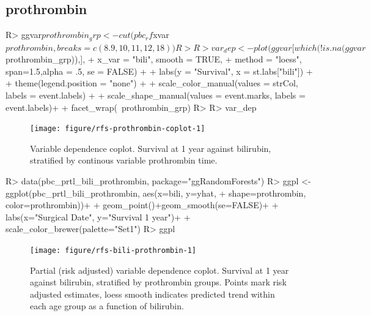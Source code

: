 \documentclass[nojss]{jss}\usepackage[]{graphicx}\usepackage[]{color}
\begin{document}
\subsection{prothrombin}
\begin{Schunk}
\begin{Sinput}
R> ggvar$prothrombin_grp <- cut(pbc_rf$xvar$prothrombin, breaks=c(8.9,10,11,12,18))
R> 
R> var_dep <- plot(ggvar[which(!is.na(ggvar$prothrombin_grp)),],
+                 x_var = "bili", smooth = TRUE, 
+                 method = "loess", span=1.5,alpha = .5, se = FALSE) + 
+   labs(y = "Survival", x = st.labs["bili"]) + 
+   theme(legend.position = "none") + 
+   scale_color_manual(values = strCol, labels = event.labels) + 
+   scale_shape_manual(values = event.marks, labels = event.labels)+ 
+   facet_wrap(~prothrombin_grp)
R> 
R> var_dep
\end{Sinput}
\begin{figure}[!htpb]

{\centering \texttt{[image: figure/rfs-prothrombin-coplot-1]} 

}

\caption[Variable dependence coplot]{Variable dependence coplot. Survival at 1 year against bilirubin, stratified by continous variable prothrombin time.\label{fig:prothrombin-coplot}}
\end{figure}
\end{Schunk}

\begin{Schunk}
\begin{Sinput}
R> data(pbc_prtl_bili_prothrombin, package="ggRandomForests")
R> ggpl <- ggplot(pbc_prtl_bili_prothrombin, aes(x=bili, y=yhat, 
+                                           shape=prothrombin, color=prothrombin))+
+   geom_point()+geom_smooth(se=FALSE)+
+   labs(x="Surgical Date", y="Survival 1 year")+
+   scale_color_brewer(palette="Set1")
R> ggpl
\end{Sinput}
\begin{figure}[!htpb]

{\centering \texttt{[image: figure/rfs-bili-prothrombin-1]} 

}

\caption[Partial (risk adjusted) variable dependence coplot]{Partial (risk adjusted) variable dependence coplot. Survival at 1 year against bilirubin, stratified by prothrombin groups. Points mark risk adjusted estimates, loess smooth indicates predicted trend within each age group as a function of bilirubin.\label{fig:bili-prothrombin}}
\end{figure}
\end{Schunk}
\end{document}
